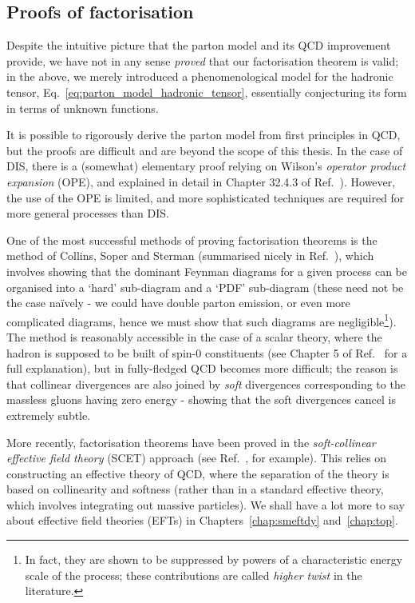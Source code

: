 \documentclass[withindex,glossary]{cam-thesis}
\begin{document}
\subsection{Proofs of factorisation}
Despite the intuitive picture that the parton model and its QCD improvement provide, we have not in any sense \textit{proved} that our factorisation theorem is valid; in the above, we merely introduced a phenomenological model for the hadronic tensor, Eq.~\eqref{eq:parton_model_hadronic_tensor}, essentially conjecturing its form in terms of unknown functions. 

It is possible to rigorously derive the parton model from first principles in QCD, but the proofs are difficult and are beyond the scope of this thesis. In the case of DIS, there is a (somewhat) elementary proof relying on Wilson's \textit{operator product expansion} (OPE), and explained in detail in Chapter 32.4.3 of Ref.~\cite{Schwartz:2014sze}). However, the use of the OPE is limited, and more sophisticated techniques are required for more general processes than DIS.

One of the most successful methods of proving factorisation theorems is the method of Collins, Soper and Sterman (summarised nicely in Ref.~\cite{Collins:1989gx}), which involves showing that the dominant Feynman diagrams for a given process can be organised into a `hard' sub-diagram and a `PDF' sub-diagram (these need not be the case na\"{i}vely - we could have double parton emission, or even more complicated diagrams, hence we must show that such diagrams are negligible\footnote{In fact, they are shown to be suppressed by powers of a characteristic energy scale of the process; these contributions are called \textit{higher twist} in the literature.}). The method is reasonably accessible in the case of a scalar theory, where the hadron is supposed to be built of spin-$0$ constituents (see Chapter 5 of Ref.~\cite{Collins:1989gx} for a full explanation), but in fully-fledged QCD becomes more difficult; the reason is that collinear divergences are also joined by \textit{soft} divergences corresponding to the massless gluons having zero energy - showing that the soft divergences cancel is extremely subtle.

More recently, factorisation theorems have been proved in the \textit{soft-collinear effective field theory} (SCET) approach (see Ref.~\cite{Bauer:2001yt}, for example). This relies on constructing an effective theory of QCD, where the separation of the theory is based on collinearity and softness (rather than in a standard effective theory, which involves integrating out massive particles). We shall have a lot more to say about effective field theories (EFTs) in Chapters~\ref{chap:smeftdy} and~\ref{chap:top}.
\end{document}
